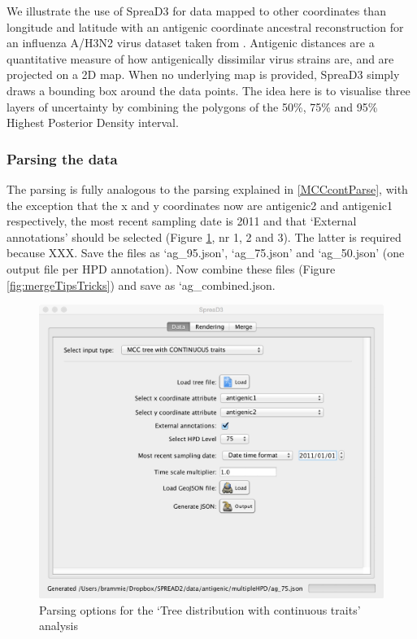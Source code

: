 \documentclass[english]{paper}
\begin{document}
We illustrate the use of SpreaD3 for data mapped to other coordinates than longitude and latitude with an antigenic coordinate ancestral reconstruction for an influenza A/H3N2 virus dataset taken from \citet{Bedford:2014aa}.
Antigenic distances are a quantitative measure of how antigenically dissimilar virus strains are, and are projected on a 2D map.
When no underlying map is provided, SpreaD3 simply draws a bounding box around the data points.
The idea here is to visualise three layers of uncertainty by combining the polygons of the 50\%, 75\% and 95\% Highest Posterior Density interval.

\subsubsection{Parsing the data}

The parsing is fully analogous to the parsing explained in \ref{MCCcontParse}, with the exception that the x and y coordinates now are antigenic2 and antigenic1 respectively, the most recent sampling date is 2011 and that `External annotations' should be selected (Figure \ref{fig:parseTipsTricks}, nr 1, 2 and 3). 
The latter is required because XXX.
Save the files as `ag\_95.json', `ag\_75.json' and `ag\_50.json' (one output file per HPD annotation). 
Now combine these files (Figure \ref{fig:mergeTipsTricks}) and save as `ag\_combined.json.

\begin{figure}[!H]
\centering
\includegraphics[width=1\textwidth]{./figures/parseAG.pdf} 
\caption{Parsing options for the `Tree distribution with continuous traits' analysis}
\label{fig:parseTipsTricks}
\end{figure}
\end{document}
